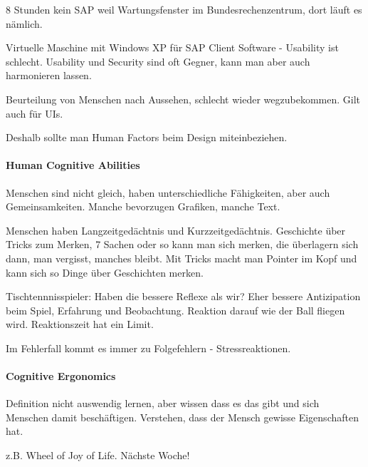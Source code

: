 8 Stunden kein SAP weil Wartungsfenster im Bundesrechenzentrum, dort läuft es
nämlich.

Virtuelle Maschine mit Windows XP für SAP Client Software - Usability ist schlecht.
Usability und Security sind oft Gegner, kann man aber auch harmonieren lassen.

Beurteilung von Menschen nach Aussehen, schlecht wieder wegzubekommen. Gilt
auch für UIs.

Deshalb sollte man Human Factors beim Design miteinbeziehen.

\paragraph{Human Cognitive Abilities}
Menschen sind nicht gleich, haben unterschiedliche Fähigkeiten, aber auch 
Gemeinsamkeiten. Manche bevorzugen Grafiken, manche Text.

Menschen haben Langzeitgedächtnis und Kurzzeitgedächtnis. 
Geschichte über Tricks zum Merken, 7 Sachen oder so kann man sich merken,
die überlagern sich dann, man vergisst, manches bleibt. Mit Tricks macht man
Pointer im Kopf und kann sich so Dinge über Geschichten merken.

Tischtennnisspieler: Haben die bessere Reflexe als wir? Eher bessere
Antizipation beim Spiel, Erfahrung und Beobachtung. Reaktion darauf wie der Ball
fliegen wird.
Reaktionszeit hat ein Limit. 

Im Fehlerfall kommt es immer zu Folgefehlern - Stressreaktionen.

\paragraph{Cognitive Ergonomics}
Definition nicht auswendig lernen, aber wissen dass es das gibt und sich
Menschen damit beschäftigen. Verstehen, dass der Mensch gewisse Eigenschaften hat.

z.B. Wheel of Joy of Life. Nächste Woche!
